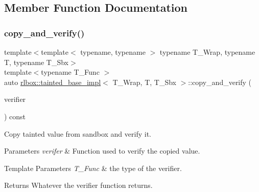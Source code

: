 \subsection{Member Function Documentation}
\mbox{\label{classrlbox_1_1tainted__base__impl_a701759aedd637f48cc97a0e6ada1c8a6}} 
\subsubsection{\texorpdfstring{copy\+\_\+and\+\_\+verify()}{copy\_and\_verify()}}
{\footnotesize\ttfamily template$<$template$<$ typename, typename $>$ typename T\+\_\+\+Wrap, typename T, typename T\+\_\+\+Sbx$>$ \\
template$<$typename T\+\_\+\+Func $>$ \\
auto \hyperlink{classrlbox_1_1tainted__base__impl}{rlbox\+::tainted\+\_\+base\+\_\+impl}$<$ T\+\_\+\+Wrap, T, T\+\_\+\+Sbx $>$\+::copy\+\_\+and\+\_\+verify (\begin{DoxyParamCaption}\item[{T\+\_\+\+Func}]{verifier }\end{DoxyParamCaption}) const\hspace{0.3cm}{\ttfamily [inline]}}



Copy tainted value from sandbox and verify it. 


\begin{DoxyParams}{Parameters}
{\em verifer} & Function used to verify the copied value. \\
\hline
\end{DoxyParams}

\begin{DoxyTemplParams}{Template Parameters}
{\em T\+\_\+\+Func} & the type of the verifier. \\
\hline
\end{DoxyTemplParams}
\begin{DoxyReturn}{Returns}
Whatever the verifier function returns. 
\end{DoxyReturn}
\mbox{\label{classrlbox_1_1tainted__base__impl_ad34419b3444d0bf37e25ecf7d37fbe0b}} 
